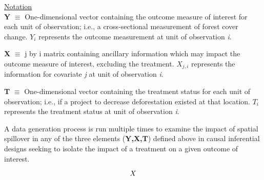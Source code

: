 \documentclass[10pt,a4paper]{report}
\begin{document}
\begin{flushleft}
\underline{Notation}\\
\vspace{0.1cm}
\textbf{Y} $\equiv$ One-dimensional vector containing the outcome measure of interest for each unit of observation; i.e., a cross-sectional measurement of forest cover change. $Y_{i}$ represents the outcome measurement at unit of observation \textit{i}. 
\vspace{0.25cm}

\textbf{X} $\equiv$ j by i matrix containing ancillary information which may impact the outcome measure of interest, excluding the treatment.  $X_{j,i}$ represents the information for covariate \textit{j} at unit of observation \textit{i}.
\vspace{0.25cm}

\textbf{T} $\equiv$ One-dimensional vector containing the treatment status for each unit of observation; i.e., if a project to decrease deforestation existed at that location.  $T_{i}$ represents the treatment status at unit of observation \textit{i}. \vspace{0.25cm}

\end{flushleft}
A data generation process is run multiple times to examine the impact of spatial spillover in any of the three elements (\textbf{Y,X,T}) defined above in causal inferential designs seeking to isolate the impact of a treatment on a given outcome of interest.


\begin{equation}
$$X$$
\end{equation}
\end{document}
